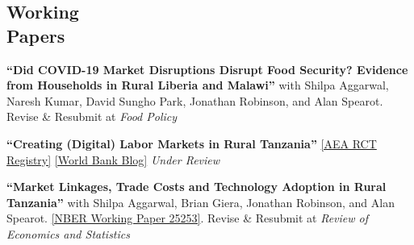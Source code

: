 \documentclass[letterpaper, margin, 10pt]{res} %
\begin{document}
\begin{resume}
\normalsize\section{\textbf{Working \\ Papers}}
\normalsize 
{\bf ``{Did COVID-19 Market Disruptions Disrupt Food Security? Evidence from Households in Rural Liberia and Malawi}''} with Shilpa Aggarwal, Naresh Kumar, David Sungho Park, Jonathan Robinson, and Alan Spearot. Revise \& Resubmit at \textit{Food Policy}

\normalsize 
{\bf ``{Creating (Digital) Labor Markets in Rural Tanzania}''} \href{https://www.socialscienceregistry.org/trials/4483}{{[AEA RCT Registry]}} \href{https://blogs.worldbank.org/impactevaluations/using-sms-transform-agricultural-labor-markets-tanzania-guest-post-dahyeon-jeong}{{[World Bank Blog]}} \textit{Under Review}

\normalsize
{\bf ``{Market Linkages, Trade Costs and Technology Adoption in Rural Tanzania}''} with Shilpa Aggarwal, Brian Giera, Jonathan Robinson, and Alan Spearot. \href{https://www.nber.org/papers/w25253.pdf}{[NBER Working Paper 25253]}. Revise \& Resubmit at \textit{Review of Economics and Statistics}



\end{resume}
\end{document}
